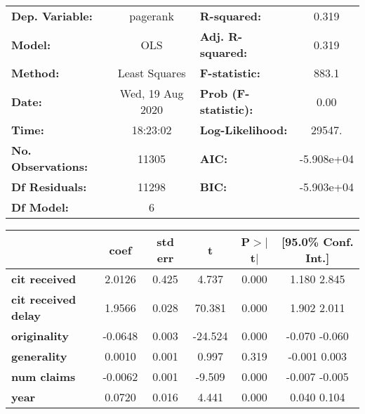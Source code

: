 \begin{center}
\begin{tabular}{lclc}
\toprule
\textbf{Dep. Variable:}     &     pagerank     & \textbf{  R-squared:         } &      0.319    \\
\textbf{Model:}             &       OLS        & \textbf{  Adj. R-squared:    } &      0.319    \\
\textbf{Method:}            &  Least Squares   & \textbf{  F-statistic:       } &      883.1    \\
\textbf{Date:}              & Wed, 19 Aug 2020 & \textbf{  Prob (F-statistic):} &      0.00     \\
\textbf{Time:}              &     18:23:02     & \textbf{  Log-Likelihood:    } &     29547.    \\
\textbf{No. Observations:}  &       11305      & \textbf{  AIC:               } &  -5.908e+04   \\
\textbf{Df Residuals:}      &       11298      & \textbf{  BIC:               } &  -5.903e+04   \\
\textbf{Df Model:}          &           6      & \textbf{                     } &               \\
\bottomrule
\end{tabular}
\begin{tabular}{lccccc}
                            & \textbf{coef} & \textbf{std err} & \textbf{t} & \textbf{P$>$$|$t$|$} & \textbf{[95.0\% Conf. Int.]}  \\
\midrule
\textbf{cit received}       &       2.0126  &        0.425     &     4.737  &         0.000        &         1.180     2.845       \\
\textbf{cit received delay} &       1.9566  &        0.028     &    70.381  &         0.000        &         1.902     2.011       \\
\textbf{originality}        &      -0.0648  &        0.003     &   -24.524  &         0.000        &        -0.070    -0.060       \\
\textbf{generality}         &       0.0010  &        0.001     &     0.997  &         0.319        &        -0.001     0.003       \\
\textbf{num claims}         &      -0.0062  &        0.001     &    -9.509  &         0.000        &        -0.007    -0.005       \\
\textbf{year}               &       0.0720  &        0.016     &     4.441  &         0.000        &         0.040     0.104       \\
\bottomrule

\end{tabular}
\end{center}
